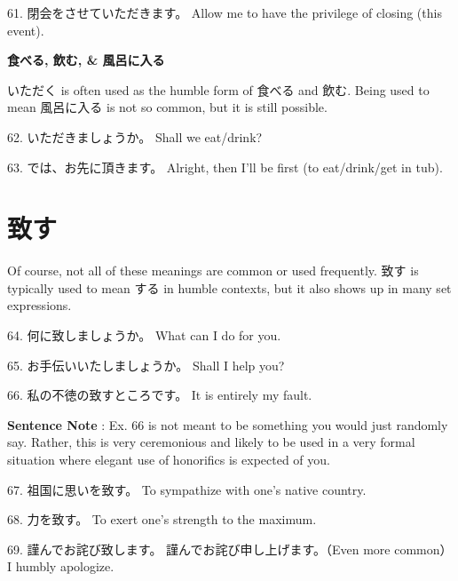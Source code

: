 \par{61. 閉会をさせていただきます。 \hfill\break
Allow me to have the privilege of closing (this event). }

\par{\textbf{食べる, 飲む, \& 風呂に入る } }

\par{いただく is often used as the humble form of 食べる and 飲む. Being used to mean 風呂に入る is not so common, but it is still possible. }

\par{62. いただきましょうか。 \hfill\break
Shall we eat\slash drink? }

\par{63. では、お先に頂きます。 \hfill\break
Alright, then I'll be first (to eat\slash drink\slash get in tub). }
      
\section{致す}
 
\par{ Of course, not all of these meanings are common or used frequently. 致す is typically used to mean する in humble contexts, but it also shows up in many set expressions. }

\par{64. 何に致しましょうか。 \hfill\break
What can I do for you. }

\par{65. お手伝いいたしましょうか。 \hfill\break
Shall I help you? }

\par{66. 私の不徳の致すところです。 \hfill\break
It is entirely my fault. }

\par{\textbf{Sentence Note }: Ex. 66 is not meant to be something you would just randomly say. Rather, this is very ceremonious and likely to be used in a very formal situation where elegant use of honorifics is expected of you. }

\par{67. 祖国に思いを致す。 \hfill\break
To sympathize with one's native country. }

\par{68. 力を致す。 \hfill\break
To exert one's strength to the maximum. }

\par{69. 謹んでお詫び致します。 \hfill\break
謹んでお詫び申し上げます。（Even more common） \hfill\break
I humbly apologize. }

